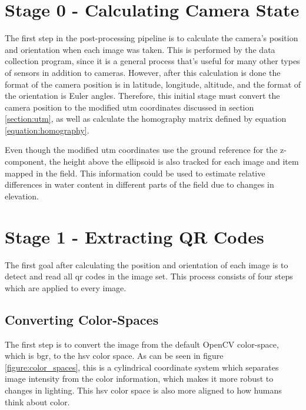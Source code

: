 \section{Stage 0 - Calculating Camera State}
\label{processing-stage0}

The first step in the post-processing pipeline is to calculate the camera's position and orientation when each image was taken.  This is performed by the data collection program, since it is a general process that's useful for many other types of sensors in addition to cameras.  However, after this calculation is done the format of the camera position is in latitude, longitude, altitude, and the format of the orientation is Euler angles.  Therefore, this initial stage must convert the camera position to the modified \ac{utm} coordinates discussed in section \ref{section:utm}, as well as calculate the homography matrix defined by equation \ref{equation:homography}.  

Even though the modified \ac{utm} coordinates use the ground reference for the z-component, the height above the ellipsoid is also tracked for each image and item mapped in the field.  This information could be used to estimate relative differences in water content in different parts of the field due to changes in elevation. 

\section{Stage 1 - Extracting QR Codes}
\label{processing-stage1}

The first goal after calculating the position and orientation of each image is to detect and read all \ac{qr} codes in the image set.  This process consists of four steps which are applied to every image.

\subsection{Converting Color-Spaces}

The first step is to convert the image from the default OpenCV color-space, which is \ac{bgr}, to the \ac{hsv} color space.  As can be seen in figure \ref{figure:color_spaces}, this is a cylindrical coordinate system which separates image intensity from the color information, which makes it more robust to changes in lighting. This \ac{hsv} color space is also more aligned to how humans think about color.

